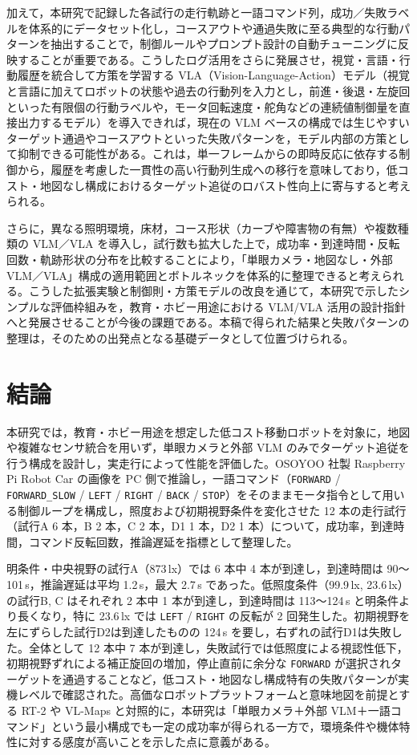 \documentclass[a4paper,11pt]{ltjsreport}
\begin{document}
加えて，本研究で記録した各試行の走行軌跡と一語コマンド列，成功／失敗ラベルを体系的にデータセット化し，コースアウトや通過失敗に至る典型的な行動パターンを抽出することで，制御ルールやプロンプト設計の自動チューニングに反映することが重要である。こうしたログ活用をさらに発展させ，視覚・言語・行動履歴を統合して方策を学習する VLA（Vision-Language-Action）モデル（視覚と言語に加えてロボットの状態や過去の行動列を入力とし，前進・後退・左旋回といった有限個の行動ラベルや，モータ回転速度・舵角などの連続値制御量を直接出力するモデル）を導入できれば，現在の VLM ベースの構成では生じやすいターゲット通過やコースアウトといった失敗パターンを，モデル内部の方策として抑制できる可能性がある。これは，単一フレームからの即時反応に依存する制御から，履歴を考慮した一貫性の高い行動列生成への移行を意味しており，低コスト・地図なし構成におけるターゲット追従のロバスト性向上に寄与すると考えられる。

さらに，異なる照明環境，床材，コース形状（カーブや障害物の有無）や複数種類の VLM／VLA を導入し，試行数も拡大した上で，成功率・到達時間・反転回数・軌跡形状の分布を比較することにより，「単眼カメラ・地図なし・外部 VLM／VLA」構成の適用範囲とボトルネックを体系的に整理できると考えられる。こうした拡張実験と制御則・方策モデルの改良を通じて，本研究で示したシンプルな評価枠組みを，教育・ホビー用途における VLM/VLA 活用の設計指針へと発展させることが今後の課題である。本稿で得られた結果と失敗パターンの整理は，そのための出発点となる基礎データとして位置づけられる。

\chapter{結論}
\label{chap:conclusion}
本研究では，教育・ホビー用途を想定した低コスト移動ロボットを対象に，地図や複雑なセンサ統合を用いず，単眼カメラと外部 VLM のみでターゲット追従を行う構成を設計し，実走行によって性能を評価した。OSOYOO 社製 Raspberry Pi Robot Car の画像を PC 側で推論し，一語コマンド（\texttt{FORWARD} / \texttt{FORWARD\_SLOW} / \texttt{LEFT} / \texttt{RIGHT} / \texttt{BACK} / \texttt{STOP}）をそのままモータ指令として用いる制御ループを構成し，照度および初期視野条件を変化させた 12 本の走行試行（試行A 6 本，B 2 本，C 2 本，D1 1 本，D2 1 本）について，成功率，到達時間，コマンド反転回数，推論遅延を指標として整理した。

明条件・中央視野の試行A（873\,lx）では 6 本中 4 本が到達し，到達時間は 90〜101\,s，推論遅延は平均 1.2\,s，最大 2.7\,s であった。低照度条件（99.9\,lx, 23.6\,lx）の試行B, C はそれぞれ 2 本中 1 本が到達し，到達時間は 113〜124\,s と明条件より長くなり，特に 23.6\,lx では \texttt{LEFT} / \texttt{RIGHT} の反転が 2 回発生した。初期視野を左にずらした試行D2は到達したものの 124\,s を要し，右ずれの試行D1は失敗した。全体として 12 本中 7 本が到達し，失敗試行では低照度による視認性低下，初期視野ずれによる補正旋回の増加，停止直前に余分な \texttt{FORWARD} が選択されターゲットを通過することなど，低コスト・地図なし構成特有の失敗パターンが実機レベルで確認された。高価なロボットプラットフォームと意味地図を前提とする RT-2 や VL-Maps と対照的に，本研究は「単眼カメラ＋外部 VLM＋一語コマンド」という最小構成でも一定の成功率が得られる一方で，環境条件や機体特性に対する感度が高いことを示した点に意義がある。
\end{document}
